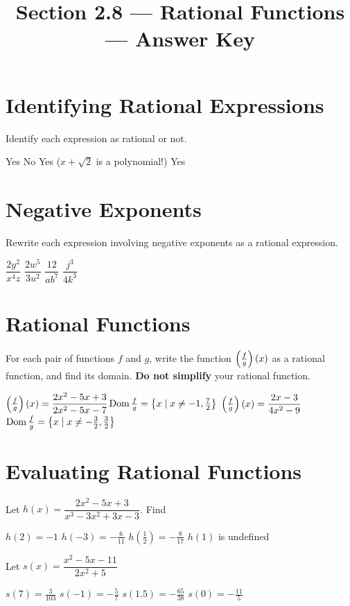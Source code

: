 

\title{Section 2.8 --- Rational Functions --- Answer Key}


\maketitle
\section*{Identifying Rational Expressions}
Identify each expression as rational or not.
\begin{smenum}
\mitemxxxo
{Yes}
{No}
{Yes ($x+\sqrt{2}$ is a polynomial!)}
\mitemx
{Yes}
\end{smenum}

\section*{Negative Exponents}
Rewrite each expression involving negative exponents as a rational expression.
\begin{smenum}
\mitemxxxx
{$\dfrac{2y^2}{x^4z}$}
{$\dfrac{2w^5}{3u^2}$}
{$\dfrac{12}{ab^{7}}$}
{$\dfrac{j^3}{4k^3}$}
\end{smenum}

\section*{Rational Functions}
For each pair of functions $f$ and $g$, write the function $\left(\frac{f}{g}\right)(x)$ as a rational function, and find its domain.  \textbf{Do not simplify} your rational function.
\begin{smenum}
\mitemx
{$\left(\frac{f}{g}\right)(x)=\dfrac{2x^2-5x+3}{2x^2-5x-7}$\qquad$\operatorname{Dom}\frac{f}{g}=\left\{x\mid x\neq-1,\frac{7}{2}\right\}$}
\mitemx
{$\left(\frac{f}{g}\right)(x)=\dfrac{2x-3}{4x^2-9}$\qquad$\operatorname{Dom}\frac{f}{g}=\left\{x\mid x\neq-\frac{3}{2},\frac{3}{2}\right\}$}
\end{smenum}

\section*{Evaluating Rational Functions}
Let $h(x)=\dfrac{2x^2-5x+3}{x^3-3x^2+3x-3}$.  Find
\begin{smenum}
\mitemxxxx
{$h(2)=-1$}
{$h(-3)=-\frac{6}{11}$}
{$h(\frac{1}{2})=-\frac{8}{17}$}
{$h(1)$ is undefined}
\end{smenum}
Let $s(x)=\dfrac{x^2-5x-11}{2x^2+5}$
\begin{smenum}
\mitemxxxx
{$s(7)=\frac{3}{103}$}
{$s(-1)=-\frac{5}{7}$}
{$s(1.5)=-\frac{65}{38}$}
{$s(0)=-\frac{11}{5}$}
\end{smenum}

